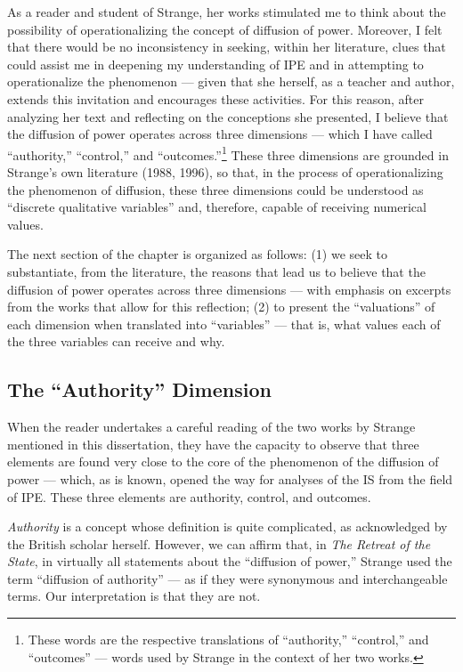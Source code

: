 As a reader and student of Strange, her works stimulated me to think about the possibility of operationalizing the concept of diffusion of power. Moreover, I felt that there would be no inconsistency in seeking, within her literature, clues that could assist me in deepening my understanding of IPE and in attempting to operationalize the phenomenon --- given that she herself, as a teacher and author, extends this invitation and encourages these activities. For this reason, after analyzing her text and reflecting on the conceptions she presented, I believe that the diffusion of power operates across three dimensions --- which I have called ``authority,'' ``control,'' and ``outcomes.''\footnote{These words are the respective translations of ``authority,'' ``control,'' and ``outcomes'' --- words used by Strange in the context of her two works.} These three dimensions are grounded in Strange's own literature (1988, 1996), so that, in the process of operationalizing the phenomenon of diffusion, these three dimensions could be understood as ``discrete qualitative variables'' and, therefore, capable of receiving numerical values.

The next section of the chapter is organized as follows: (1) we seek to substantiate, from the literature, the reasons that lead us to believe that the diffusion of power operates across three dimensions --- with emphasis on excerpts from the works that allow for this reflection; (2) to present the ``valuations'' of each dimension when translated into ``variables'' --- that is, what values each of the three variables can receive and why.

\subsection{The ``Authority'' Dimension}

When the reader undertakes a careful reading of the two works by Strange mentioned in this dissertation, they have the capacity to observe that three elements are found very close to the core of the phenomenon of the diffusion of power --- which, as is known, opened the way for analyses of the IS from the field of IPE. These three elements are authority, control, and outcomes.

\textit{Authority} is a concept whose definition is quite complicated, as acknowledged by the British scholar herself. However, we can affirm that, in \textit{The Retreat of the State}, in virtually all statements about the ``diffusion of power,'' Strange used the term ``diffusion of authority'' --- as if they were synonymous and interchangeable terms. Our interpretation is that they are not.


